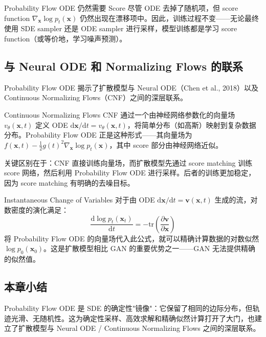 \documentclass[a4paper]{article}
\begin{document}
\begin{warningbox}{Probability Flow ODE 仍然需要 Score}
尽管 ODE 去掉了随机项，但 score function $\nabla_{\mathbf{x}} \log p_t(\mathbf{x})$ 仍然出现在漂移项中。因此，训练过程不变——无论最终使用 SDE sampler 还是 ODE sampler 进行采样，模型训练都是学习 score function（或等价地，学习噪声预测）。
\end{warningbox}

\subsection{与 Neural ODE 和 Normalizing Flows 的联系}

Probability Flow ODE 揭示了扩散模型与 Neural ODE（Chen et al., 2018）以及 Continuous Normalizing Flows（CNF）之间的深层联系。

\begin{knowledgebox}{Continuous Normalizing Flows}
CNF 通过一个由神经网络参数化的向量场 $v_\theta(\mathbf{x}, t)$ 定义 ODE $\mathrm{d}\mathbf{x}/\mathrm{d}t = v_\theta(\mathbf{x}, t)$，将简单分布（如高斯）映射到复杂数据分布。Probability Flow ODE 正是这种形式——其向量场为 $f(\mathbf{x}, t) - \frac{1}{2}g(t)^2 \nabla_{\mathbf{x}} \log p_t(\mathbf{x})$，其中 score 部分由神经网络近似。

关键区别在于：CNF 直接训练向量场，而扩散模型先通过 score matching 训练 score 网络，然后利用 Probability Flow ODE 进行采样。后者的训练更加稳定，因为 score matching 有明确的去噪目标。
\end{knowledgebox}

\begin{importantbox}{Instantaneous Change of Variables}
对于由 ODE $\mathrm{d}\mathbf{x}/\mathrm{d}t = \mathbf{v}(\mathbf{x}, t)$ 生成的流，对数密度的演化满足：
$$
\frac{\mathrm{d}\log p_t(\mathbf{x}_t)}{\mathrm{d}t} = -\mathrm{tr}\left(\frac{\partial \mathbf{v}}{\partial \mathbf{x}}\right)
$$
将 Probability Flow ODE 的向量场代入此公式，就可以精确计算数据的对数似然 $\log p_0(\mathbf{x}_0)$。这是扩散模型相比 GAN 的重要优势之一——GAN 无法提供精确的似然值。
\end{importantbox}

\subsection{本章小结}

Probability Flow ODE 是 SDE 的确定性"镜像"：它保留了相同的边际分布，但轨迹光滑、无随机性。这为确定性采样、高效求解和精确似然计算打开了大门，也建立了扩散模型与 Neural ODE / Continuous Normalizing Flows 之间的深层联系。
\end{document}
